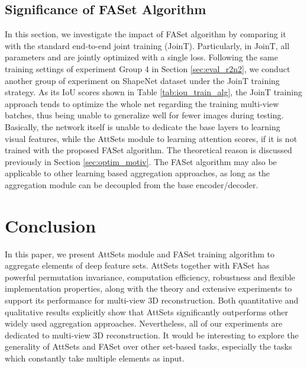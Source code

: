 \documentclass[twocolumn]{svjour3}    \pdfoutput=1
\newcommand{\nickname}{AttSets}
\newcommand{\faset}{FASet}
\newcommand{\rev}{}
\begin{document}
\vspace{-0.3cm}
\subsection{Significance of \faset{} Algorithm}\label{sec:sig_faset}
In this section, we investigate the impact of \faset{} algorithm by comparing it with the standard end-to-end joint training (JoinT). Particularly, in JoinT, all parameters  and  are jointly optimized with a single loss. Following the same training settings of experiment Group 4 in Section \ref{sec:eval_r2n2}, we conduct another group of experiment on ShapeNet dataset under the JoinT training strategy. As its IoU scores shown in Table \ref{tab:iou_train_alg}, the JoinT training approach tends to optimize the whole net regarding the training multi-view batches, thus being unable to generalize well for fewer images during testing. Basically, the network itself is unable to dedicate the base layers to learning visual features, while the \nickname{} module to learning attention scores, if it is not trained with the proposed \faset{} algorithm. The theoretical reason is discussed previously in Section \ref{sec:optim_motiv}. \rev{The \faset{} algorithm may also be applicable to other learning based aggregation approaches, as long as the aggregation module can be decoupled from the base encoder/decoder.}

\vspace{-0.4cm}
\section{Conclusion}
In this paper, we present \nickname{} module and \faset{} training algorithm to aggregate elements of deep feature sets. \nickname{} together with \faset{} has powerful permutation invariance, computation efficiency, robustness and flexible implementation properties, along with the theory and extensive experiments to support its performance for multi-view 3D reconstruction. Both quantitative and qualitative results explicitly show that \nickname{} significantly outperforms other widely used aggregation approaches. Nevertheless, all of our experiments are dedicated to multi-view 3D reconstruction. It would be interesting to explore the generality of \nickname{} and \faset{} over other set-based tasks, especially the tasks which constantly take multiple elements as input.

\clearpage
         
\end{document}
